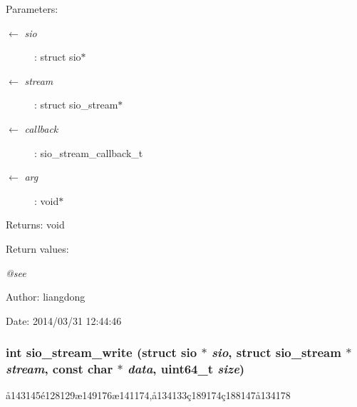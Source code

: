 \begin{Desc}
\item[Parameters:]
\begin{description}
\item[\mbox{$\leftarrow$} {\em sio}]: struct sio$\ast$ \item[\mbox{$\leftarrow$} {\em stream}]: struct sio\_\-stream$\ast$ \item[\mbox{$\leftarrow$} {\em callback}]: sio\_\-stream\_\-callback\_\-t \item[\mbox{$\leftarrow$} {\em arg}]: void$\ast$ \end{description}
\end{Desc}
\begin{Desc}
\item[Returns:]void \end{Desc}
\begin{Desc}
\item[Return values:]
\begin{description}
\item[{\em @see}]\end{description}
\end{Desc}
\begin{Desc}
\item[Author:]liangdong \end{Desc}
\begin{Desc}
\item[Date:]2014/03/31 12:44:46 \end{Desc}
\subsubsection{\setlength{\rightskip}{0pt plus 5cm}int sio\_\-stream\_\-write (struct sio $\ast$ {\em sio}, struct sio\_\-stream $\ast$ {\em stream}, const char $\ast$ {\em data}, uint64\_\-t {\em size})}\label{sio__stream_8c_a11}


\aa{}143145\'{e}128129\ae{}149176\ae{}141174,\aa{}134133\c{c}189174\c{c}188147\aa{}134178 

